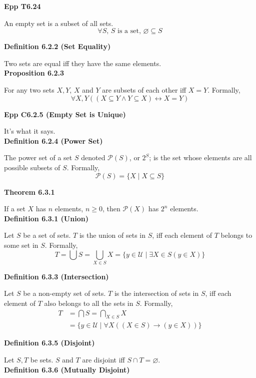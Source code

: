 \documentclass[a4paper]{article}
\newcommand{\subheading}[1]{{\scriptsize\textbf{#1}}}
\begin{document}
\begin{multicols*}{4}
\subheading{Epp T6.24}

An empty set is a subset of all sets.
$$\forall S\text{, $S$ is a set, }\varnothing \subseteq S$$

\subheading{Definition 6.2.2 (Set Equality)}

Two sets are equal iff they have the same elements.\\

\subheading{Proposition 6.2.3}

For any two sets $X, Y$, $X$ and $Y$ are subsets of each other iff $X = Y$.
Formally,
$$\forall X, Y((X \subseteq Y \land Y \subseteq X) \longleftrightarrow X=Y)$$

\subheading{Epp C6.2.5 (Empty Set is Unique)}

It's what it says.\\

\subheading{Definition 6.2.4 (Power Set)}

The power set of a set $S$ denoted $\mathcal{P}(S)$, or $2^S$; is the set whose
elements are all possible subsets of $S$. Formally,
$$\mathcal{P}(S) = \{X\;|\;X\subseteq S\}$$

\subheading{Theorem 6.3.1}

If a set $X$ has $n$ elements, $n \geq 0$, then $\mathcal{P}(X)$ has $2^n$
elements. \\

\subheading{Definition 6.3.1 (Union)}

Let $S$ be a set of sets. $T$ is the union of sets in $S$, iff each element of
$T$ belongs to some set in $S$. Formally,
$$T=\bigcup S = \bigcup_{X\in S} X = \{ y \in \mathcal{U}\;|\;\exists X \in S (y
\in X)\}$$

\subheading{Definition 6.3.3 (Intersection)}

Let $S$ be a non-empty set of sets. $T$ is the intersection of sets in $S$, iff
each element of $T$ also belongs to all the sets in $S$. Formally,
\begin{align*}
T &= \bigcap S = \bigcap_{X \in S} X \\
&= \{y \in \mathcal{U}\;|\; \forall X ((X \in S) \rightarrow (y \in X)) \}
\end{align*}

\subheading{Definition 6.3.5 (Disjoint)}

Let $S, T$ be sets. $S$ and $T$ are disjoint iff $S \cap T = \varnothing$.\\

\subheading{Definition 6.3.6 (Mutually Disjoint)}


\end{multicols*}
\end{document}
